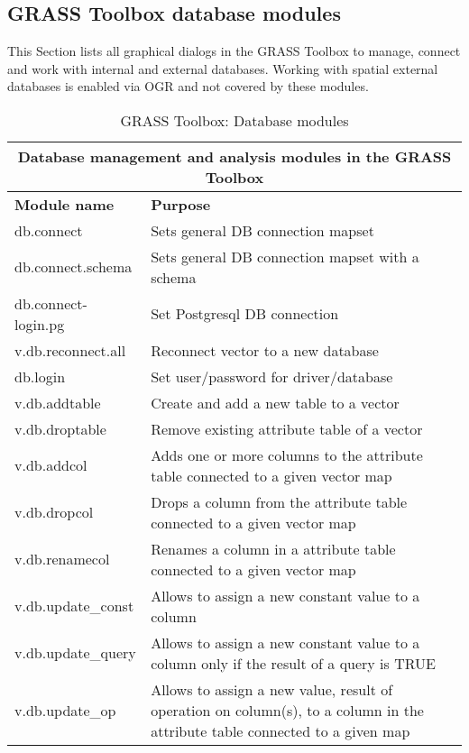 \subsection{GRASS Toolbox database modules}

This Section lists all graphical dialogs in the GRASS Toolbox to manage, 
connect and work with internal and external databases. Working with spatial 
external databases is enabled via OGR and not covered by these modules.

\begin{table}[ht]
\centering
\caption{GRASS Toolbox: Database modules}\medskip
 \begin{tabular}{|p{4cm}|p{12cm}|}
  \hline \multicolumn{2}{|c|}{\textbf{Database management and analysis modules in the GRASS
  Toolbox}} \\
  \hline \textbf{Module name} & \textbf{Purpose} \\
  \hline db.connect & Sets general DB connection mapset \\
  \hline db.connect.schema & Sets general DB connection mapset with a schema \\
  \hline db.connect-login.pg & Set Postgresql DB connection \\
  \hline v.db.reconnect.all & Reconnect vector to a new database \\
  \hline db.login & Set user/password for driver/database \\
  \hline v.db.addtable & Create and add a new table to a vector \\
  \hline v.db.droptable & Remove existing attribute table of a vector \\
  \hline v.db.addcol & Adds one or more columns to the attribute table
  connected to a given vector map \\
  \hline v.db.dropcol & Drops a column from the attribute table connected to
  a given vector map\\
  \hline v.db.renamecol & Renames a column in a attribute table connected to
  a given vector map\\
  \hline v.db.update\_const & Allows to assign a new constant value to a
  column \\
  \hline v.db.update\_query & Allows to assign a new constant value to a
  column only if the result of a query is TRUE \\
  \hline v.db.update\_op & Allows to assign a new value, result of operation
  on column(s), to a column in the attribute table connected to a given map\\

\end{tabular}
\end{table}
